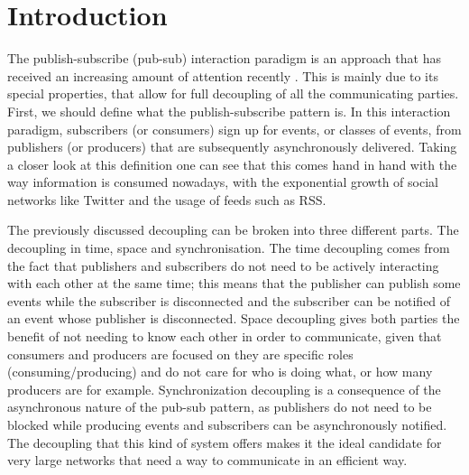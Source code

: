 
%
%

\section{Introduction}

The publish-subscribe (pub-sub) interaction paradigm is an approach that
has received an increasing amount of attention recently \cite{Kermarrec2013} \cite{Eugster2003}.
This is mainly due to its special properties, that allow for full decoupling of all the communicating
parties. First, we should define what the publish-subscribe pattern is.
In this interaction paradigm, subscribers (or consumers) sign up for
events, or classes of events, from publishers (or producers) that are
subsequently asynchronously delivered. Taking a closer look at this
definition one can see that this comes hand in hand with the way
information is consumed nowadays, with the exponential growth of social
networks like Twitter and the usage of feeds such as RSS.

The previously discussed decoupling can be broken into three different
parts. The decoupling in time, space and synchronisation. The time
decoupling comes from the fact that publishers and subscribers do not
need to be actively interacting with each other at the same time; this
means that the publisher can publish some events while the subscriber is
disconnected and the subscriber can be notified of an event whose
publisher is disconnected. Space decoupling gives both parties the
benefit of not needing to know each other in order to communicate, given
that consumers and producers are focused on they are specific roles
(consuming/producing) and do not care for who is doing what, or how many
producers are for example. Synchronization decoupling is a consequence
of the asynchronous nature of the pub-sub pattern, as publishers do not
need to be blocked while producing events and subscribers can be
asynchronously notified. The decoupling that this kind of system offers
makes it the ideal candidate for very large networks that need a way to
communicate in an efficient way.

